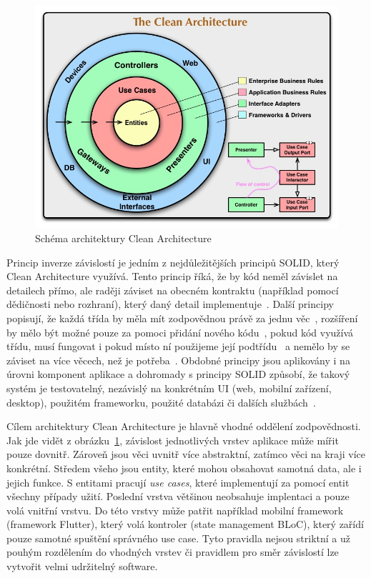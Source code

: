 \begin{figure}[h!]
    \centering
    \includegraphics[width=\linewidth]{assets/technology-research/architecture/clean-architecture.jpg}
    \caption{Schéma architektury
    Clean Architecture~\cite{the_clean_architecture}}
    \label{fig:the_clean_architecture}
\end{figure}

Princip inverze závislostí je jedním z nejdůležitějších principů SOLID,
který Clean Architecture využívá. 
Tento princip říká,
že by kód neměl závislet na detailech přímo,
ale raději záviset na obecném kontraktu (například pomocí dědičnosti nebo rozhraní),
který daný detail implementuje~\cite[kapitola~11]{martin_clean_architecture}.
Další principy popisují,
že každá třída by měla mít zodpovědnou právě za jednu
věc~\cite[kapitola~7]{martin_clean_architecture},
rozšíření by mělo být možné pouze za pomoci přidání nového
kódu~\cite[kapitola~8]{martin_clean_architecture},
pokud kód využívá třídu,
musí fungovat i pokud místo ní použijeme její
podtřídu~\cite[kapitola~8]{martin_clean_architecture}
a nemělo by se záviset na více věcech,
než je potřeba~\cite[kapitola10]{martin_clean_architecture}.
Obdobné principy jsou aplikovány i na úrovni komponent aplikace
a dohromady s principy SOLID způsobí,
že takový systém je testovatelný,
nezávislý na konkrétním UI (web, mobilní zařízení, desktop),
použitém frameworku, použité databázi či dalších
službách~\cite{the_clean_architecture}.

Cílem architektury Clean Architecture je hlavně vhodné oddělení zodpovědnosti.
Jak jde vidět z obrázku~\ref{fig:the_clean_architecture},
závislost jednotlivých vrstev aplikace může mířit pouze dovnitř.
Zároveň jsou věci uvnitř více abstraktní,
zatímco věci na kraji více konkrétní.
Středem všeho jsou entity,
které mohou obsahovat samotná data,
ale i jejich funkce.
S entitami pracují \emph{use cases},
které implementují za pomocí entit všechny případy užití.
Poslední vrstva většinou neobsahuje implentaci
a pouze volá vnitřní vrstvu.
Do této vrstvy může patřit například mobilní framework (framework Flutter),
který volá kontroler (state management BLoC),
který zařídí pouze samotné spuštění správného use case.
Tyto pravidla nejsou striktní a už pouhým rozdělením do vhodných vrstev
či pravidlem pro směr závislostí lze vytvořit velmi udržitelný
software.~\cite{the_clean_architecture}

